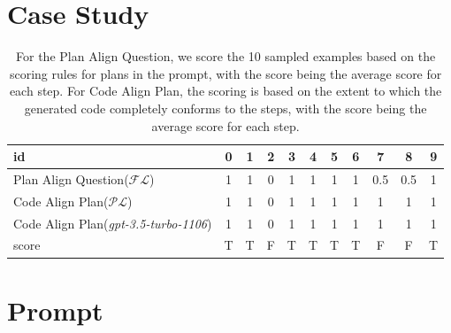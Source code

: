 \documentclass[11pt]{article}
\begin{document}
\section{Case Study}
\label{casestudy}


\begin{table}[h]
\centering
\small
{%
\begin{tabular}{|l|cccccccccc|}
\hline
\textbf{id} & 0 & 1 & 2 & 3 & 4 & 5 & 6 & 7 & 8 & 9 \\
\hline
Plan Align Question($\mathcal{FL}$) & 1 & 1 & 0 & 1 & 1 & 1 & 1 & 0.5 & 0.5 & 1 \\
Code Align Plan($\mathcal{PL}$) & 1 & 1 & 0 & 1 & 1 & 1 & 1& 1 & 1 & 1 \\
Code Align Plan(\textit{gpt-3.5-turbo-1106}) & 1 & 1 & 0 & 1 & 1 & 1 & 1 & 1 & 1 & 1 \\ 
score & T & T & F & T & T & T & T & F & F & T \\
\hline
\end{tabular}
}
\caption{For the Plan Align Question, we score the 10 sampled examples based on the scoring rules for plans in the prompt, with the score being the average score for each step. For Code Align Plan, the scoring is based on the extent to which the generated code completely conforms to the steps, with the score being the average score for each step.}
\label{tab:casestudy}
\end{table}


\section{Prompt}
\label{prompt}
\end{document}
